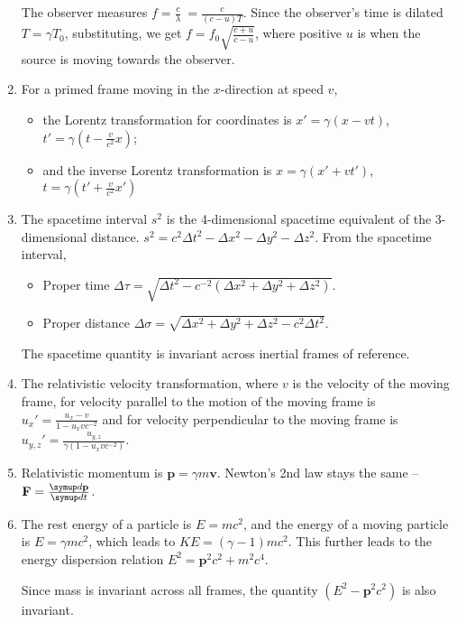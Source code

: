 \begin{enumerate}
    The observer measures \(f = \frac{c}{\lambda}\ = \frac{c}{(c-u)T}\). Since the observer's time is dilated \(T = \gamma T_0\), substituting, we get \(f = f_0\sqrt{\frac{c + u}{c - u}}\), where positive \(u\) is when the source is moving towards the observer.
    \item For a primed frame moving in the \(x\)-direction at speed \(v\),
    \begin{itemize}
        \item the Lorentz transformation for coordinates is \(x\prime = \gamma(x-vt)\), \(t\prime = \gamma\left(t - \frac{v}{c^2}x\right)\);
        \item and the inverse Lorentz transformation is \(x = \gamma(x\prime+vt\prime)\), \(t = \gamma\left(t\prime + \frac{v}{c^2}x\prime\right)\)
    \end{itemize}
    \item The spacetime interval \(s^2\) is the 4-dimensional spacetime equivalent of the 3-dimensional distance. \(s^2 = c^2\Delta t^2 - \Delta x^2 - \Delta y^2 - \Delta z^2\). From the spacetime interval,
    \begin{itemize}
        \item Proper time \(\Delta\tau = \sqrt{\Delta t^2 - c^{-2}(\Delta x^2 + \Delta y^2 + \Delta z^2)}\).
        \item Proper distance \(\Delta\sigma = \sqrt{\Delta x^2 + \Delta y^2 + \Delta z^2 - c^2\Delta t^2}\).
    \end{itemize}
    The spacetime quantity is invariant across inertial frames of reference.
    \item The relativistic velocity transformation, where \(v\) is the velocity of the moving frame, for velocity parallel to the motion of the moving frame is \(u_x\prime = \frac{u_x - v}{1 - u_xvc^{-2}}\) and for velocity perpendicular to the moving frame is \(u_{y,z}\prime = \frac{u_{y,z}}{\gamma(1-u_xvc^{-2})}\).
    \item Relativistic momentum is \(\mathbf{p} = \gamma m\mathbf{v}\). Newton's 2nd law stays the same -- \(\mathbf{F} = \sldd{\mathbf{p}}{t}\).
    \item The rest energy of a particle is \(E = mc^2\), and the energy of a moving particle is \(E = \gamma mc^2\), which leads to \(KE = (\gamma-1)mc^2\). This further leads to the energy dispersion relation \(E^2 = \mathbf{p}^2c^2 + m^2c^4\).
    
    Since mass is invariant across all frames, the quantity \((E^2 - \mathbf{p}^2c^2)\) is also invariant.
\end{enumerate}
